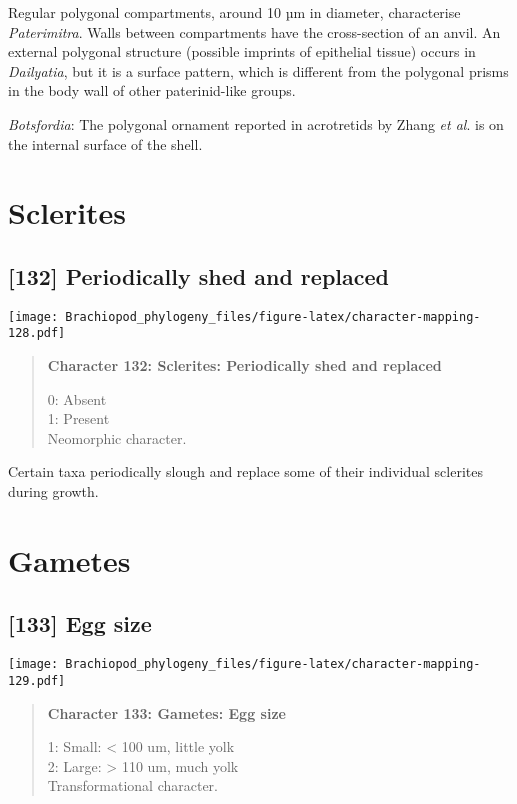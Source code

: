 \documentclass[openany]{book}
\theoremstyle{definition}
\theoremstyle{definition}
\theoremstyle{definition}
\theoremstyle{remark}
\begin{document}
Regular polygonal compartments, around 10 µm in diameter, characterise
\emph{Paterimitra}. Walls between compartments have the cross-section of
an anvil. An external polygonal structure (possible imprints of
epithelial tissue) occurs in \emph{Dailyatia}, but it is a surface
pattern, which is different from the polygonal prisms in the body wall
of other paterinid-like groups.

\hypertarget{Botsfordia-coding-131}{}
\emph{Botsfordia}: The polygonal ornament reported in acrotretids by
Zhang \emph{et al}. \citeyearpar{Zhang2016Epithelialcell} is on the
internal surface of the shell.

\section{Sclerites}\label{sclerites-1}

\subsection*{{[}132{]} Periodically shed and
replaced}\label{periodically-shed-and-replaced}

\texttt{[image: Brachiopod\_phylogeny\_files/figure-latex/character-mapping-128.pdf]}

\begin{quote}
\textbf{Character 132: Sclerites: Periodically shed and replaced}

0: Absent\\
1: Present\\
Neomorphic character.
\end{quote}

Certain taxa periodically slough and replace some of their individual
sclerites during growth.

\section{Gametes}\label{gametes}

\subsection*{{[}133{]} Egg size}\label{egg-size}

\texttt{[image: Brachiopod\_phylogeny\_files/figure-latex/character-mapping-129.pdf]}

\begin{quote}
\textbf{Character 133: Gametes: Egg size}

1: Small: \textless{} 100 um, little yolk\\
2: Large: \textgreater{} 110 um, much yolk\\
Transformational character.
\end{quote}
\end{document}
